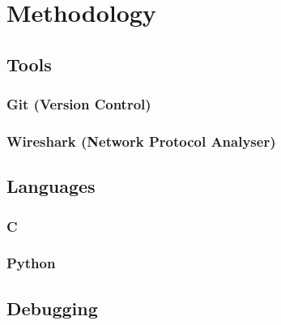 	\section{Methodology}
		
		\subsection{Tools}
			
			\subsubsection{Git (Version Control)}
			
			\subsubsection{Wireshark (Network Protocol Analyser)}
		
		\subsection{Languages}
			
			\subsubsection{C}
			
			\subsubsection{Python}
		
		\subsection{Debugging}
